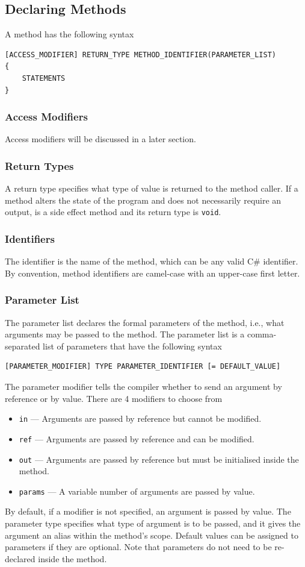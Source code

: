 \documentclass{article}
\begin{document}
\subsection{Declaring Methods}
A method has the following syntax
\begin{verbatim}
[ACCESS_MODIFIER] RETURN_TYPE METHOD_IDENTIFIER(PARAMETER_LIST)
{
    STATEMENTS
}
\end{verbatim}
\subsubsection{Access Modifiers}
Access modifiers will be discussed in a later section.
\subsubsection{Return Types}
A return type specifies what type of value is returned to the method
caller. If a method alters the state of the program and does not
necessarily require an output, is a side effect method and its return
type is \texttt{void}.
\subsubsection{Identifiers}
The identifier is the name of the method, which can be any valid C\#
identifier. By convention, method identifiers are camel-case with an
upper-case first letter.
\subsubsection{Parameter List}
The parameter list declares the formal parameters of the method, i.e.,
what arguments may be passed to the method. The parameter list is a
comma-separated list of parameters that have the following syntax
\begin{verbatim}
[PARAMETER_MODIFIER] TYPE PARAMETER_IDENTIFIER [= DEFAULT_VALUE]
\end{verbatim}
The parameter modifier tells the compiler whether to send an argument
by reference or by value. There are 4 modifiers to choose from
\begin{itemize}
    \item \texttt{in} --- Arguments are passed by reference but cannot be modified.
    \item \texttt{ref} --- Arguments are passed by reference and can be modified.
    \item \texttt{out} --- Arguments are passed by reference but must be initialised inside the method.
    \item \texttt{params} --- A variable number of arguments are passed by value.
\end{itemize}
By default, if a modifier is not specified, an argument is passed by value.
The parameter type specifies what type of argument is to be passed, and
it gives the argument an alias within the method's scope. Default values
can be assigned to parameters if they are optional.
Note that parameters do not need to be re-declared inside the method.
\end{document}

